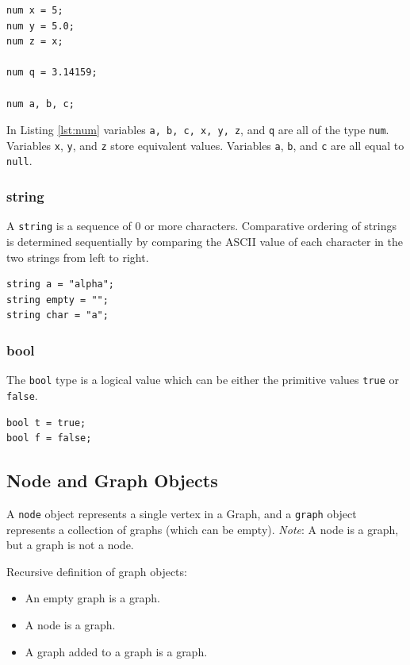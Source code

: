 \documentclass{article}
\newcommand{\code}[1]{\texttt{#1}} %
\begin{document}
\begin{lstlisting}[language=pltLang, caption=Declaration of ``num'' types., label=lst:num]
num x = 5;
num y = 5.0;
num z = x;

num q = 3.14159;

num a, b, c;
\end{lstlisting}

In Listing \ref{lst:num} variables \code{a, b, c, x, y, z}, and \code{q} are all of the type \code{num}. Variables \code{x}, \code{y}, and \code{z} store equivalent values. Variables \code{a}, \code{b}, and \code{c} are all equal to \code{null}.

\subsubsection{string}

A \code{string} is a sequence of 0 or more characters. Comparative ordering of strings is determined sequentially by comparing the ASCII value of each character in the two strings from left to right.

\begin{lstlisting}[language=pltLang, caption=Declaration of ``string'' types., label=lst:string]
string a = "alpha";
string empty = "";
string char = "a";
\end{lstlisting}

\subsubsection{bool}

The \code{bool} type is a logical value which can be either the primitive values \code{true} or \code{false}.

\begin{lstlisting}[language=pltLang, caption=Declaration of ``bool'' types., label=lst:bool]
bool t = true;
bool f = false;
\end{lstlisting}

\subsection{Node and Graph Objects}

A \code{node} object represents a single vertex in a Graph, and a \code{graph} object represents a collection of graphs (which can be empty). \emph{Note}: A node is a graph, but a graph is not a node.

Recursive definition of graph objects:
\begin{itemize}
\item An empty graph is a graph.
\item A node is a graph.
\item A graph added to a graph is a graph.
\end{itemize}
\end{document}

